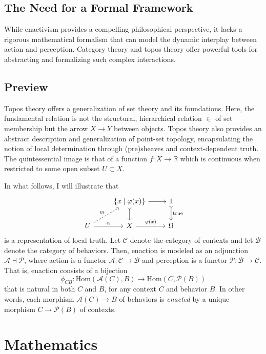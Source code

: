 \documentclass{article}
\begin{document}
\subsection{The Need for a Formal Framework}

While enactivism provides a compelling philosophical perspective, it lacks a rigorous mathematical formalism that can model the dynamic interplay between action and perception. Category theory and topos theory offer powerful tools for abstracting and formalizing such complex interactions.

\subsection{Preview}

Topos theory offers a generalization of set theory and its foundations. Here, the fundamental relation is not the structural, hierarchical relation $\in$ of set membership but the arrow $X \to Y$ between objects. Topos theory also provides an abstract description and generalization of point-set topology, encapsulating the notion of local determination through (pre)sheaves and context-dependent truth. The quintessential image is that of a function $f \colon X \to \mathbb{R}$ which is continuous when restricted to some open subset $U \subset X$.

In what follows, I will illustrate that  
\[
\begin{tikzcd}
& \{ x \mid \varphi(x) \}  \arrow[r] \arrow[d, tail] & 1 \arrow[d, tail, "\text{true}"] \\
U \arrow[r, "\alpha"] \arrow[ru, dashed, "m"] & X \arrow[r, "\varphi(x)"] & \Omega
\end{tikzcd}
\]
is a representation of local truth. Let $\mathcal{C}$ denote the category of contexts and let $\mathcal{B}$ denote the category of behaviors. Then, enaction is modeled as an adjunction $\mathcal{A} \dashv \mathcal{P}$, where action is a functor $\mathcal{A} \colon \mathcal{C} \to \mathcal{B}$ and perception is a functor $\mathcal{P} \colon \mathcal{B} \to \mathcal{C}$. That is, enaction consists of a bijection 
\[
\phi_{CB} \colon \text{Hom} ( \mathcal{A}(C), B ) \to \text{Hom}(C, \mathcal{P}(B))
\]
that is natural in both $C$ and $B$, for any context $C$ and behavior $B$. In other words, each morphism $\mathcal{A}(C) \to B$ of behaviors is \emph{enacted} by a unique morphism $C \to \mathcal{P}(B)$ of contexts.


\section{Mathematics}
\end{document}
